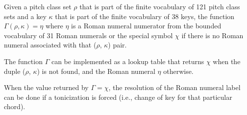 
Given a pitch class set $\rho$ that is part of the finite
vocabulary of 121 pitch class sets and a key $\kappa$ that
is part of the finite vocabulary of 38 keys, the function
$\Gamma(\rho, \kappa) = \eta$ where $\eta$ is a Roman
numeral numerator from the bounded vocabulary of 31 Roman
numerals or the special symbol $\chi$ if there is no Roman
numeral associated with that ($\rho$, $\kappa$) pair.

The function $\Gamma$ can be implemented as a lookup table
that returns $\chi$ when the duple ($\rho$, $\kappa$) is not
found, and the Roman numeral $\eta$ otherwise.

When the value returned by $\Gamma = \chi$, the resolution
of the Roman numeral label can be done if a tonicization is
forced (i.e., change of key for that particular chord).

